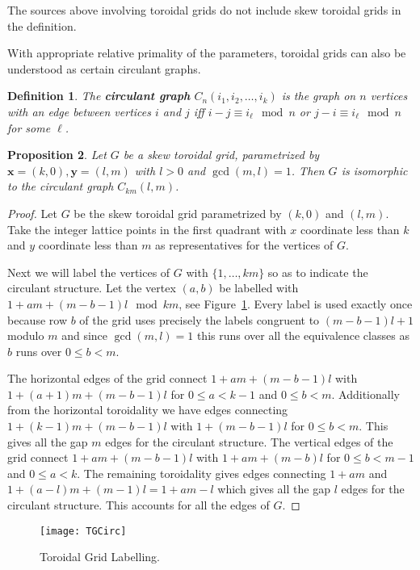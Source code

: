 \documentclass[12pt]{amsart}
\newtheorem{definition}{Definition}
\newtheorem{proposition}[definition]{Proposition}
\numberwithin{definition}{section}
\begin{document}
        The sources above involving toroidal grids do not include skew toroidal grids in the definition. %
        
        With appropriate relative primality of the parameters, toroidal grids can also be understood as certain circulant graphs.
        \begin{definition}
          The \textbf{circulant graph} $C_n(i_1, i_2, \ldots, i_k)$ is the graph on $n$ vertices with an edge between vertices $i$ and $j$ iff $i-j \equiv i_\ell \mod n$ or $j-i \equiv i_\ell \mod n$ for some $\ell$.
        \end{definition}
        
\begin{proposition}
	Let $G$ be a skew toroidal grid, parametrized by $\mathbf{x}=(k,0), \mathbf{y}=(l,m)$ with $l > 0$ and $\gcd(m, l)=1$. Then $G$ is isomorphic to the circulant graph $C_{km}(l,m)$. 
\end{proposition}
\begin{proof}
  Let $G$ be the skew toroidal grid parametrized by $(k,0)$ and $(l,m)$.
  Take the integer lattice points in the first quadrant with $x$ coordinate less than $k$ and $y$ coordinate less than $m$ as representatives for the vertices of $G$.

  Next we will label the vertices of $G$ with $\{1, \ldots, km\}$ so as to indicate the circulant structure.  Let the vertex $(a,b)$ be labelled with $1 + am + (m-b-1)l \mod km$, see Figure~\ref{fig tor lab}.   Every label is used exactly once because row $b$ of the grid uses precisely the labels congruent to $(m-b-1)l+1$ modulo $m$ and since $\gcd(m, l)=1$ this runs over all the equivalence classes as $b$ runs over $0\leq b < m$.

  The horizontal edges of the grid connect $1+am+(m-b-1)l$ with $1+(a+1)m + (m-b-1)l$ for $0 \leq a < k-1$ and $0 \leq b < m$.  Additionally from the horizontal toroidality we have edges connecting $1+(k-1)m+(m-b-1)l$ with $1+(m-b-1)l$ for $0\leq b < m$.  This gives all the gap $m$ edges for the circulant structure.  The vertical edges of the grid connect $1+am+(m-b-1)l$ with $1+am+(m-b)l$ for $0\leq b < m-1$ and $0\leq a < k$.  The remaining toroidality gives edges connecting $1+am$ and $1+(a-l)m+(m-1)l = 1+am -l$ which gives all the gap $l$ edges for the circulant structure.  This accounts for all the edges of $G$.
%  
\end{proof}
\begin{figure}[h]
	\texttt{[image: TGCirc]}
	\caption{Toroidal Grid Labelling.}\label{fig tor lab}
\end{figure}
\end{document}
